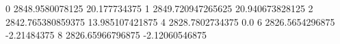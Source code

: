 0 2848.9580078125 20.177734375
1 2849.720947265625 20.940673828125
2 2842.765380859375 13.985107421875
4 2828.7802734375 0.0
6 2826.5654296875 -2.21484375
8 2826.65966796875 -2.12060546875
